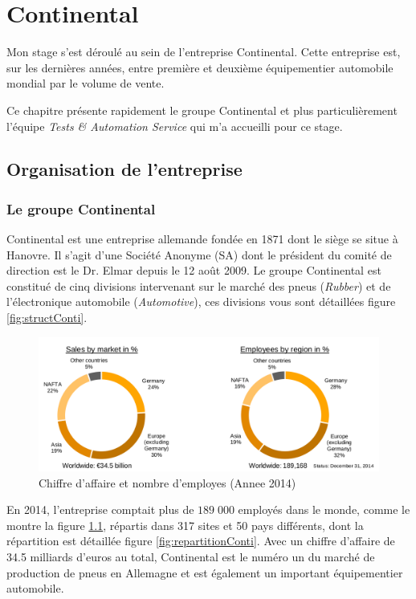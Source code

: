 \chapter{Continental}\label{chapConti}
\putminitoc
Mon stage s'est déroulé au sein de l'entreprise Continental. Cette entreprise est, sur les dernières années, entre première et deuxième équipementier automobile mondial par le volume de vente.

Ce chapitre présente rapidement le groupe Continental et plus particulièrement l'équipe \textit{Tests \& Automation Service} qui m'a accueilli pour ce stage.

	\section{Organisation de l'entreprise}
		\subsection{Le groupe Continental}
Continental est une entreprise allemande fondée en 1871 dont le siège se situe à Hanovre. Il s'agit d'une Société Anonyme (SA) dont le président du comité de
direction est le Dr. Elmar  depuis le 12 août 2009. Le groupe Continental est constitué de cinq divisions intervenant sur le marché des pneus (\textit{Rubber}) et de l'électronique automobile (\textit{Automotive}), ces divisions vous sont détaillées figure \ref{fig:structConti}.
	 
		 \begin{figure}[H]
		 	\centering
		 	\includegraphics[width=17cm]{contents/images/caConti.png}
		 	\caption[Chiffre d'affaire et nombre d'employes (Annee 2014)]{Chiffre d'affaire et nombre d'employes (Annee 2014)\footnotemark{}}
		 	\label{fig:caConti}
		 \end{figure}
		 En 2014, l'entreprise comptait plus de $189\;000$ employés dans le monde, comme le montre la figure \ref{fig:caConti}, répartis dans 317 sites et 50 pays différents, dont la répartition est détaillée figure \ref{fig:repartitionConti}. Avec un chiffre d'affaire de 34.5 milliards d'euros au total, Continental est le numéro un du marché de production de pneus en Allemagne et est également un important équipementier automobile.

